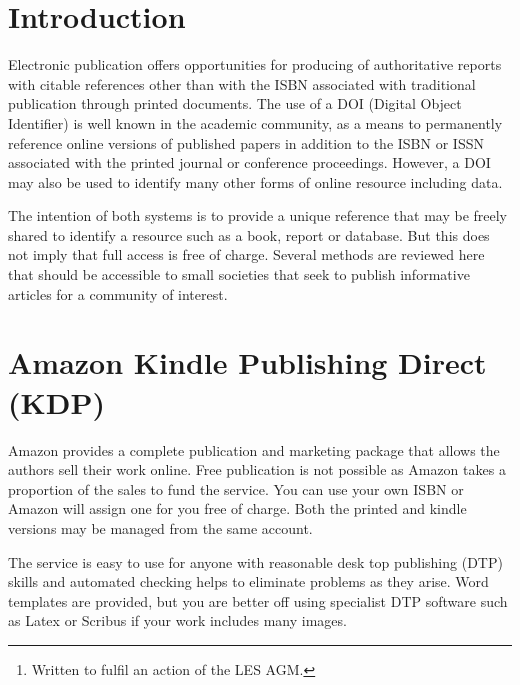 \documentclass{article}
\title{\myTitleMainTitle}
\author{
    Dr Paul J. Palmer
    \thanks{Written to fulfil an action of the LES AGM.}
   \\
    Author and Determination \\
    Microscope ID Club \\
  Leicestershire VC55 \\
  \texttt{\href{mailto:palmerpjp@gmail.com}{\nolinkurl{palmerpjp@gmail.com}}} 
}
\begin{document}
\maketitle


\begin{abstract}
\myAbstract
\end{abstract}


\hypertarget{introduction}{%
\section{Introduction}\label{introduction}}

Electronic publication offers opportunities for producing of authoritative reports with citable references other than with the ISBN associated with traditional publication through printed documents. The use of a DOI (Digital Object Identifier) is well known in the academic community, as a means to permanently reference online versions of published papers in addition to the ISBN or ISSN associated with the printed journal or conference proceedings. However, a DOI may also be used to identify many other forms of online resource including data.

The intention of both systems is to provide a unique reference that may be freely shared to identify a resource such as a book, report or database. But this does not imply that full access is free of charge.  Several methods are reviewed here that should be accessible to small societies that seek to publish informative articles for a community of interest.

\section{Amazon Kindle Publishing Direct (KDP)}

Amazon provides a complete publication and marketing package that allows the authors sell their work online. Free publication is not possible as Amazon takes a proportion of the sales to fund the service. You can use your own ISBN or Amazon will assign one for you free of charge. Both the printed and kindle versions may be managed from the same account.

The service is easy to use for anyone with reasonable desk top publishing (DTP) skills and automated checking helps to eliminate problems as they arise. Word templates are provided, but you are better off using specialist DTP software such as Latex or Scribus if your work includes many images.
\end{document}
